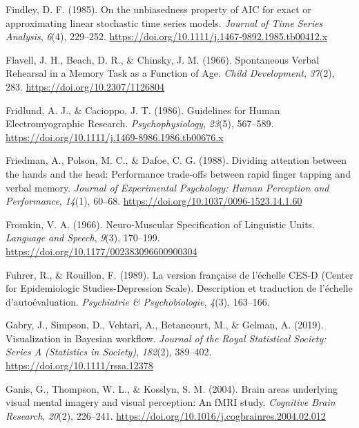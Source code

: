 \documentclass[a4paper,12pt,twoside,openright,oldfontcommands]{memoir}
\begin{document}
\leavevmode\hypertarget{ref-findley_unbiasedness_1985}{}%
Findley, D. F. (1985). On the unbiasedness property of AIC for exact or approximating linear stochastic time series models. \emph{Journal of Time Series Analysis}, \emph{6}(4), 229--252. \url{https://doi.org/10.1111/j.1467-9892.1985.tb00412.x}

\leavevmode\hypertarget{ref-flavell_spontaneous_1966}{}%
Flavell, J. H., Beach, D. R., \& Chinsky, J. M. (1966). Spontaneous Verbal Rehearsal in a Memory Task as a Function of Age. \emph{Child Development}, \emph{37}(2), 283. \url{https://doi.org/10.2307/1126804}

\leavevmode\hypertarget{ref-fridlund_guidelines_1986}{}%
Fridlund, A. J., \& Cacioppo, J. T. (1986). Guidelines for Human Electromyographic Research. \emph{Psychophysiology}, \emph{23}(5), 567--589. \url{https://doi.org/10.1111/j.1469-8986.1986.tb00676.x}

\leavevmode\hypertarget{ref-friedman_dividing_1988}{}%
Friedman, A., Polson, M. C., \& Dafoe, C. G. (1988). Dividing attention between the hands and the head: Performance trade-offs between rapid finger tapping and verbal memory. \emph{Journal of Experimental Psychology: Human Perception and Performance}, \emph{14}(1), 60--68. \url{https://doi.org/10.1037/0096-1523.14.1.60}

\leavevmode\hypertarget{ref-fromkin_neuro-muscular_1966}{}%
Fromkin, V. A. (1966). Neuro-Muscular Specification of Linguistic Units. \emph{Language and Speech}, \emph{9}(3), 170--199. \url{https://doi.org/10.1177/002383096600900304}

\leavevmode\hypertarget{ref-fuhrer_version_1989}{}%
Fuhrer, R., \& Rouillon, F. (1989). La version française de l'échelle CES-D (Center for Epidemiologic Studies-Depression Scale). Description et traduction de l'échelle d'autoévaluation. \emph{Psychiatrie \& Psychobiologie}, \emph{4}(3), 163--166.

\leavevmode\hypertarget{ref-gabry_visualization_2019}{}%
Gabry, J., Simpson, D., Vehtari, A., Betancourt, M., \& Gelman, A. (2019). Visualization in Bayesian workﬂow. \emph{Journal of the Royal Statistical Society: Series A (Statistics in Society)}, \emph{182}(2), 389--402. \url{https://doi.org/10.1111/rssa.12378}

\leavevmode\hypertarget{ref-ganis_brain_2004}{}%
Ganis, G., Thompson, W. L., \& Kosslyn, S. M. (2004). Brain areas underlying visual mental imagery and visual perception: An fMRI study. \emph{Cognitive Brain Research}, \emph{20}(2), 226--241. \url{https://doi.org/10.1016/j.cogbrainres.2004.02.012}
\end{document}
